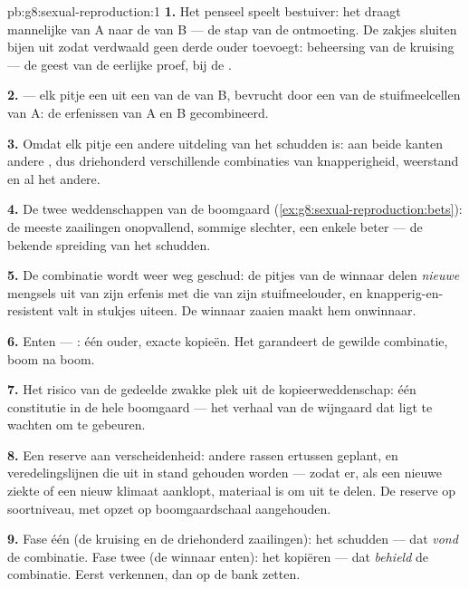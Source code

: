 \begin{solution}{pb:g8:sexual-reproduction:1}
\textbf{1.} Het penseel speelt bestuiver: het draagt mannelijke 
van A naar de  van B --- de stap van de ontmoeting. De zakjes
sluiten bijen uit zodat verdwaald  geen derde ouder toevoegt:
beheersing van de kruising --- de geest van de eerlijke proef, bij de
.

\textbf{2.}  --- elk pitje een  uit een van de  van B,
bevrucht door een van de stuifmeelcellen van A: de erfenissen van A en B
gecombineerd.

\textbf{3.} Omdat elk pitje een andere uitdeling van het schudden is: aan
beide kanten andere , dus driehonderd verschillende combinaties van
knapperigheid, weerstand en al het andere.

\textbf{4.} De twee weddenschappen van de boomgaard
(\cref{ex:g8:sexual-reproduction:bets}): de meeste zaailingen
onopvallend, sommige slechter, een enkele beter --- de bekende spreiding
van het schudden.

\textbf{5.} De combinatie wordt weer weg geschud: de pitjes van de winnaar
delen \emph{nieuwe} mengsels uit van zijn erfenis met die van zijn
stuifmeelouder, en knapperig-en-resistent valt in stukjes uiteen. De
winnaar zaaien maakt hem onwinnaar.

\textbf{6.} Enten --- : één ouder, exacte
kopieën. Het garandeert de gewilde combinatie, boom na boom.

\textbf{7.} Het risico van de gedeelde zwakke plek uit de
kopieerweddenschap: één constitutie in de hele boomgaard --- het verhaal
van de wijngaard dat ligt te wachten om te gebeuren.

\textbf{8.} Een reserve aan verscheidenheid: andere rassen ertussen
geplant, en veredelingslijnen die uit  in stand gehouden worden ---
zodat er, als een nieuwe ziekte of een nieuw klimaat aanklopt, materiaal
is om uit te delen. De reserve op soortniveau, met opzet op boomgaardschaal
aangehouden.

\textbf{9.} Fase één (de kruising en de driehonderd zaailingen): het
schudden --- dat \emph{vond} de combinatie. Fase twee (de winnaar enten):
het kopiëren --- dat \emph{behield} de combinatie. Eerst verkennen, dan
op de bank zetten.


\end{solution}
